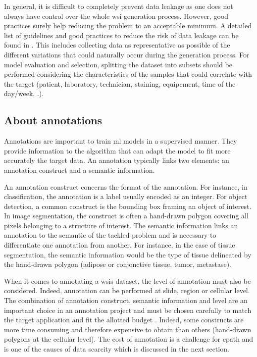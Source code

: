 
In general, it is difficult to completely prevent data leakage as one does not always have control over the whole \acrshort{wsi} generation process. However, good practices surely help reducing the problem to an acceptable minimum. A detailed list of guidelines and good practices to reduce the risk of data leakage can be found in \cite{maree2017need}. This includes collecting data as representative as possible of the different variations that could naturally occur during the generation process. For model evaluation and selection, splitting the dataset into subsets should be performed considering the characteristics of the samples that could correlate with the target (\ie patient, laboratory, technician, staining, equipement, time of the day/week, \etc.).

\subsection{About annotations}
\label{ssec:backdp:conceptannotation}

Annotations are important to train \acrlong{ml} models in a supervised manner. They provide information to the algorithm that can adapt the model to fit more accurately the target data. An annotation typically links two elements: an annotation construct and a semantic information. 

An annotation construct concerns the format of the annotation. For instance, in classification, the annotation is a label usually encoded as an integer. For object detection, a common construct is the bounding box framing an object of interest. In image segmentation, the construct is often a hand-drawn polygon covering all pixels belonging to a structure of interest. The semantic information links an annotation to the semantic of the tackled problem and is necessary to differentiate one annotation from another. For instance, in the case of tissue segmentation, the semantic information would be the type of tissue delineated by the hand-drawn polygon (\eg adipose or conjonctive tissue, tumor, metastase).

When it comes to annotating a \acrshort{wsi}s dataset, the level of annotation must also be considered. Indeed, annotation can be performed at slide, region or cellular level. The combination of annotation construct, semantic information and level are an important choice in an annotation project and must be chosen carefully to match the target application and fit the allotted budget \cite{wahab2022semantic}. Indeed, some constructs are more time consuming and therefore expensive to obtain than others (\eg hand-drawn polygons at the cellular level). The cost of annotation is a challenge for \acrlong{cpath} and is one of the causes of data scarcity which is discussed in the next section. 

